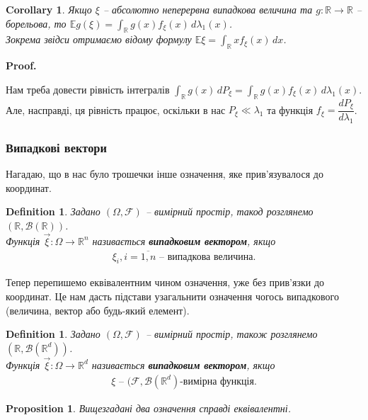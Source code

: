 \documentclass[a4paper, 10pt]{article}
\makeatletter
\theoremstyle{theoremdd}
\newtheorem{definition}[theorem]{Definition}
\newtheorem{proposition}[theorem]{Proposition}
\newtheorem{corollary}[theorem]{Corollary}
\renewenvironment{proof}[1][Proof.\\]{\par
\pushQED{\hfill \qed}%
\normalfont \topsep6\p@\@plus6\p@\relax
\trivlist
\item\relax
{\bfseries
#1\@addpunct{.}}\hspace\labelsep\ignorespaces
}{%
\popQED\endtrivlist\@endpefalse
}
\makeatother
\begin{document}
\begin{corollary}
Якщо $\xi$ -- абсолютно неперервна випадкова величина та $g \colon \mathbb{R} \to \mathbb{R}$ -- борельова, то $\mathbb{E} g(\xi) = \displaystyle\int_{\mathbb{R}} g(x)f_{\xi}(x)\,d\lambda_1(x)$.\\
Зокрема звідси отримаємо відому формулу $\mathbb{E}\xi = \displaystyle\int_{\mathbb{R}} x f_{\xi}(x)\,dx$.
\end{corollary}

\begin{proof}
Нам треба довести рівність інтегралів $\displaystyle\int_{\mathbb{R}}g(x)\,dP_\xi = \int_{\mathbb{R}} g(x)f_{\xi}(x)\,d\lambda_1(x)$. Але, насправді, ця рівність працює, оскільки в нас $P_\xi \ll \lambda_1$ та функція $f_\xi = \dfrac{dP_{\xi}}{d\lambda_1}$.
\end{proof}

\subsubsection*{Випадкові вектори}
Нагадаю, що в нас було трошечки інше означення, яке прив'язувалося до координат.
\begin{definition}
Задано $(\Omega,\mathcal{F})$ -- вимірний простір, такод розглянемо $(\mathbb{R}, \mathcal{B}(\mathbb{R}))$.\\
Функція $\vec{\xi} \colon \Omega \to \mathbb{R}^n$ називається \textbf{випадковим вектором}, якщо
\begin{align*}
\xi_i, i = \overline{1,n} \text{ -- випадкова величина.}
\end{align*}
\end{definition}
\noindent
Тепер перепишемо еквівалентним чином означення, уже без прив'язки до координат. Це нам дасть підстави узагальнити означення чогось випадкового (величина, вектор або будь-який елемент).
\begin{definition}
Задано $(\Omega,\mathcal{F})$ -- вимірний простір, також розглянемо $(\mathbb{R},\mathcal{B}(\mathbb{R}^d))$.\\
Функція $\vec{\xi} \colon \Omega \to \mathbb{R}^d$ називається \textbf{випадковим вектором}, якщо
\begin{align*}
\xi \text{ -- $(\mathcal{F},\mathcal{B}(\mathbb{R}^d)$-вимірна функція.}
\end{align*}
\end{definition}

\begin{proposition}
Вищезгадані два означення справді еквівалентні.
\end{proposition}
\end{document}
